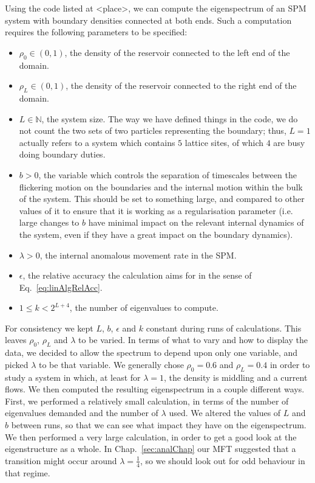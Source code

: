 Using the code listed at <place>, we can compute the eigenspectrum of an SPM system
with boundary densities connected at both ends. Such a computation requires the
following parameters to be specified:
\begin{itemize}
 \item $\rho_0 \in (0, 1)$, the density of the reservoir connected to the left end of the domain.
 \item $\rho_L \in (0, 1)$, the density of the reservoir connected to the right end of the domain.
 \item $L \in \mathbb{N}$, the system size.  The way we have defined things in the code, we do not
 count the two sets of two particles representing the boundary; thus, $L=1$ actually
 refers to a system which contains $5$ lattice sites, of which $4$ are busy doing
 boundary duties.
 \item $b>0$, the variable which controls the separation of timescales between the 
 flickering motion on the boundaries and the internal motion within the bulk of the
 system. This should be set to something large, and compared to other values of it
 to ensure that it is working as a regularisation parameter
 (i.e. large changes to $b$ have minimal impact on the relevant internal
 dynamics of the system, even if they have a great impact on the boundary dynamics).
 \item $\lambda>0$, the internal anomalous movement rate in the SPM.
 \item $\epsilon$, the relative accuracy the calculation aims for in the sense of Eq.~\ref{eq:linAlgRelAcc}.
 \item $1 \le k < 2^{L+4}$, the number of eigenvalues to compute.
 \end{itemize}

 For consistency we kept $L$, $b$, $\epsilon$ and $k$ constant during runs of 
 calculations. This leaves $\rho_0$, $\rho_L$ and $\lambda$ to be varied. In terms of what to vary and how to display the data, we decided to
 allow the spectrum to depend upon only one variable, and picked $\lambda$ to be that
 variable. We generally chose $\rho_0 =0.6$ and $\rho_L =0.4$ in order to study a system in which,
 at least for $\lambda=1$, the density is middling and a current flows.
 We then computed the resulting eigenspectrum in a couple different ways.
 First, we performed a relatively small calculation, in terms of the number of eigenvalues demanded and the number of $\lambda$ used. We altered the values of $L$
 and $b$ between runs, so that we can see what impact they have on the eigenspectrum. We then performed a very
 large calculation, in order to get a good look at the eigenstructure as a whole.
 In Chap.~\ref{sec:analChap} our MFT suggested that a transition might occur around
 $\lambda=\frac{1}{4}$, so we should look out for odd behaviour in that regime.

